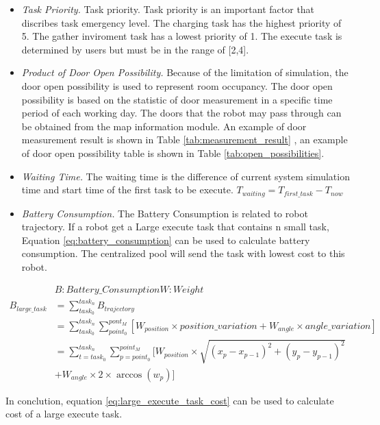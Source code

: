 \begin{itemize}
\item \textsl{Task Priority.} Task priority. Task priority is an important factor that discribes task emergency level. The charging task has the highest priority of 5. The gather inviroment task has a lowest priority of 1. 
	The execute task is determined by users but must be in the range of [2,4]. 
\item \textsl{Product of Door Open Possibility.} Because of the limitation of simulation, the door open possibility is used to represent room occupancy. The door open possibility is based on the statistic of door measurement in a specific time period of each working day. 
	The doors that the robot may pass through can be obtained from the map information module.
	An example of door measurement result is shown in Table \ref{tab:measurement_result} , an example of door open possibility table is shown in Table \ref{tab:open_possibilities}. 
\item \textsl{Waiting Time. } The waiting time is the difference of current system simulation time and start time of the first task to be execute. $T_{waiting} = T_{first\_task} - T_{now}$
\item \textsl{Battery Consumption.} The Battery Consumption is related to robot trajectory. If a robot get a Large execute task that contains n small task, Equation \ref{eq:battery_consumption} can be used to calculate battery consumption. The centralized pool will send the task with lowest cost to this robot.
\end{itemize}
\begin{equation}
\begin{aligned}
\label{eq:battery_consumption}
&B: Battery\_Consumption W: Weight\\
B_{large\_task} & = \sum_{task_0}^{task_n} B_{trajectory} \\
& = \sum_{task_0}^{task_n} \sum_{point_0}^{pont_M} [W_{position} \times position\_variation+W_{angle}  \times angle\_variation]\\
& = \sum_{t = task_0}^{task_n} \sum_{p = point_0}^{point_M} [ W_{position} \times \sqrt{(x_p-x_{p-1} )^2+(y_p-y_{p-1} )^2} \\
&   + W_{angle} \times 2 \times \arccos(w_p)] 
\end{aligned}
\end{equation}

In conclution, equation \ref{eq:large_execute_task_cost} can be used to calculate cost of a large execute task.

